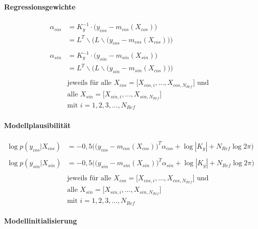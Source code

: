 \paragraph*{Regressionsgewichte}


\begin{align}\label{eq:gprweights}
	\alpha_{cos} &= K_y^{-1} \cdot \big( y_{cos} - m_{cos}(X_{cos}) \big) \nonumber \\
				 &= L^T \backslash \Big(L \backslash \big( y_{cos} - m_{cos}(X_{cos}) \big) \Big) \nonumber \\
	\\
	\alpha_{sin} &= K_y^{-1} \cdot \big( y_{sin} - m_{sin}(X_{sin}) \big) \nonumber \\
				 &= L^T \backslash \Big(L \backslash \big( y_{sin} - m_{sin}(X_{cos}) \big) \Big) \nonumber \\
	\nonumber \\
& \text{jeweils für alle } X_{cos} = \big[ X_{cos,i},\dots, X_{cos,N_{Ref}} \big] \text{ und } \nonumber \\
& \text{alle } X_{sin} = \big[ X_{sin,i},\dots, X_{sin,N_{Ref}} \big] \nonumber \\
& \text{mit } i = 1,2,3,\ldots,N_{Ref} \nonumber
\end{align}


\paragraph*{Modellplausibilität}


\begin{align}\label{eq:likelihoods}
	\log p(y_{cos}|X_{cos}) &= -0,5 \Big( \big( y_{cos} - m_{cos}(X_{cos}) \big)^T \alpha_{cos} + \log|K_y| + N_{Ref} \log 2\pi  \Big) \nonumber \\
	\\
	\log p(y_{sin}|X_{sin}) &= -0,5 \Big( \big( y_{sin} - m_{sin}(X_{sin}) \big)^T \alpha_{sin} + \log|K_y| + N_{Ref} \log 2\pi  \Big) \nonumber \\
	\nonumber \\
& \text{jeweils für alle } X_{cos} = \big[ X_{cos,i},\dots, X_{cos,N_{Ref}} \big] \text{ und } \nonumber \\
& \text{alle } X_{sin} = \big[ X_{sin,i},\dots, X_{sin,N_{Ref}} \big] \nonumber \\
& \text{mit } i = 1,2,3,\ldots,N_{Ref} \nonumber	
\end{align}


\paragraph*{Modellinitialisierung}


